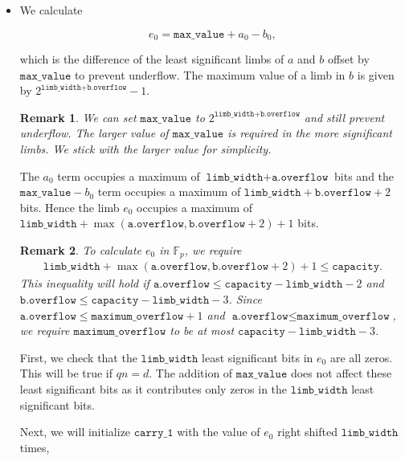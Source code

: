 \documentclass[a4paper, 12pt]{article}
\newtheorem*{remark}{Remark}
\begin{document}
\begin{itemize}
  \item We calculate 

    $$e_0 = \texttt{max\_value} + a_0 - b_0,$$

    which is the difference of the least significant limbs of $a$ and $b$ offset by $\texttt{max\_value}$ to prevent underflow.  The maximum value of a limb in $b$ is given by $2^{\texttt{limb\_width} + \texttt{b.overflow}}-1$.

    \begin{remark}
    We can set $\texttt{max\_value}$ to $2^{\texttt{limb\_width}+\texttt{b.overflow}}$ and still prevent underflow. The larger value of $\texttt{max\_value}$ is required in the more significant limbs. We stick with the larger value for simplicity.
    \end{remark}
    
    The $a_0$ term occupies a maximum of $\texttt{limb\_width} + \texttt{a.overflow}$ bits and the $\texttt{max\_value} - b_0$ term occupies a maximum of $\texttt{limb\_width} + \texttt{b.overflow} + 2$ bits. Hence the limb $e_0$ occupies a maximum of $\texttt{limb\_width} + \max(\texttt{a.overflow}, \texttt{b.overflow} + 2) + 1$ bits.

    \begin{remark}
    To calculate $e_0$ in $\mathbb{F}_p$, we require 
\begin{align*}
  \texttt{limb\_width} + \max(\texttt{a.overflow}, \texttt{b.overflow} + 2) + 1 \le \texttt{capacity}.
\end{align*}
This inequality will hold if $\texttt{a.overflow} \le \texttt{capacity} - \texttt{limb\_width} - 2$ and $\texttt{b.overflow} \le \texttt{capacity} - \texttt{limb\_width} - 3$. Since $\texttt{a.overflow} \le \texttt{maximum\_overflow} + 1$ and $\texttt{a.overflow} \le \texttt{maximum\_overflow}$, we require $\texttt{maximum\_overflow}$ to be at most $\texttt{capacity} - \texttt{limb\_width} - 3$.
    \end{remark}
    
    First, we check that the $\texttt{limb\_width}$ least significant bits in $e_0$ are all zeros. This will be true if $qn = d$. The addition of $\texttt{max\_value}$ does not affect these least significant bits as it contributes only zeros in the $\texttt{limb\_width}$ least significant bits.

    Next, we will initialize $\texttt{carry\_1}$ with the value of $e_0$ right shifted $\texttt{limb\_width}$ times,
    

\end{itemize}
\end{document}

